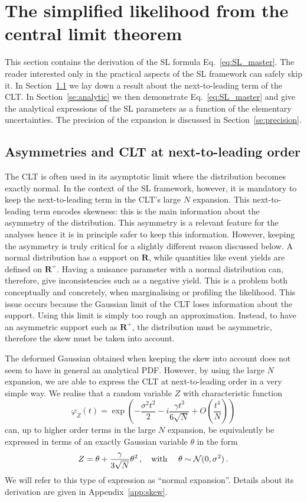 \documentclass[11pt]{article}
\newcommand{\be}{\begin{equation}}
\newcommand{\ee}{\end{equation}}
\begin{document}
\section{The simplified likelihood from the central limit theorem}
\label{se:SL_theory}

This section contains the derivation of the SL formula Eq.~\eqref{eq:SL_master}.
The reader interested only in the practical aspects of the SL framework can safely skip it. In Section~\ref{se:skew_CLT} we lay down a  result about the next-to-leading term of the CLT. In Section~\ref{se:analytic} we then demonstrate Eq.~\eqref{eq:SL_master} and give the analytical expressions of the SL parameters as a function of the elementary uncertainties. The precision of the expansion is discussed in Section~\ref{se:precision}. 

\subsection{Asymmetries and CLT at next-to-leading order}
\label{se:skew_CLT}

The CLT is often used in its asymptotic limit where the distribution becomes exactly normal. In the context of the SL framework, however, it is mandatory to keep the next-to-leading  term in the CLT's large $N$ expansion. This next-to-leading term encodes skewness: this is the main information about the asymmetry of the distribution. This asymmetry is a relevant feature for the analyses hence it is in principle safer to keep this information. However, keeping the asymmetry is truly critical for a slightly different reason discussed below. A normal distribution has a support on $\mathbf{R}$, while quantities like event yields are defined on $\mathbf{R}^+$. Having a nuisance parameter with a normal distribution can, therefore, give inconsistencies such as a negative yield. This is a problem both conceptually and concretely, when marginalising or profiling the likelihood. This issue occurs because the Gaussian limit of the CLT loses information about the support. Using this limit is simply too rough an approximation. Instead, to have an asymmetric support such as $\mathbf{R}^+$,  the distribution must be asymmetric, therefore the skew must be taken into account.


The deformed Gaussian obtained when keeping the skew into account does not seem to have in general an analytical PDF. 
However, by using the large $N$ expansion, we are able to express the CLT at next-to-leading order in a very simple way. 
We realise that a random variable $Z$ with characteristic function
\be
\varphi_Z(t)=\exp\left(-\frac{\sigma^2 t^2}{2}-i \frac{\gamma t^3}{6 \sqrt{N}} +O\left(\frac{t^4}{N}\right)\right) \label{eq:CF_CLT}
 \ee
can, up to higher order terms in the large $N$ expansion, be equivalently be expressed in terms of an exactly Gaussian variable $\theta$ in the form
\be
Z= \theta+\frac{\gamma}{3\sqrt{N}}\theta^2\,,  \quad \textrm{with } \quad \theta\sim{\cal N}(0,\sigma^2)\,. \label{eq:ZskewCLT}
\ee
We will refer to this type of expression as ``normal expansion''. Details about its derivation are given in Appendix~\ref{app:skew}.
\end{document}
